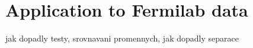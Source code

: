 \chapter{Application to Fermilab data}
jak dopadly testy, srovnavani promennych, jak dopadly separace
